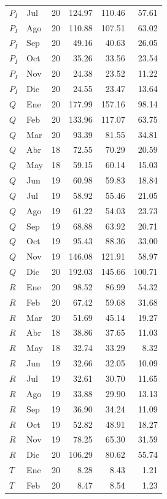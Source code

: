 \documentclass[12pt,letterpaper]{article}
\begin{document}
\begin{longtable}{llrrrr}
$P_I$ & Jul & 20 & 124.97 & 110.46 & 57.61 \\
$P_I$ & Ago & 20 & 110.88 & 107.51 & 63.02 \\
$P_I$ & Sep & 20 & 49.16 & 40.63 & 26.05 \\
$P_I$ & Oct & 20 & 35.26 & 33.56 & 23.54 \\
$P_I$ & Nov & 20 & 24.38 & 23.52 & 11.22 \\
$P_I$ & Dic & 20 & 24.55 & 23.47 & 13.64 \\
$Q$ & Ene & 20 & 177.99 & 157.16 & 98.14 \\
$Q$ & Feb & 20 & 133.96 & 117.07 & 63.75 \\
$Q$ & Mar & 20 & 93.39 & 81.55 & 34.81 \\
$Q$ & Abr & 18 & 72.55 & 70.29 & 20.59 \\
$Q$ & May & 18 & 59.15 & 60.14 & 15.03 \\
$Q$ & Jun & 19 & 60.98 & 59.83 & 18.84 \\
$Q$ & Jul & 19 & 58.92 & 55.46 & 21.05 \\
$Q$ & Ago & 19 & 61.22 & 54.03 & 23.73 \\
$Q$ & Sep & 19 & 68.88 & 63.92 & 20.71 \\
$Q$ & Oct & 19 & 95.43 & 88.36 & 33.00 \\
$Q$ & Nov & 19 & 146.08 & 121.91 & 58.97 \\
$Q$ & Dic & 20 & 192.03 & 145.66 & 100.71 \\
$R$ & Ene & 20 & 98.52 & 86.99 & 54.32 \\
$R$ & Feb & 20 & 67.42 & 59.68 & 31.68 \\
$R$ & Mar & 20 & 51.69 & 45.14 & 19.27 \\
$R$ & Abr & 18 & 38.86 & 37.65 & 11.03 \\
$R$ & May & 18 & 32.74 & 33.29 & 8.32 \\
$R$ & Jun & 19 & 32.66 & 32.05 & 10.09 \\
$R$ & Jul & 19 & 32.61 & 30.70 & 11.65 \\
$R$ & Ago & 19 & 33.88 & 29.90 & 13.13 \\
$R$ & Sep & 19 & 36.90 & 34.24 & 11.09 \\
$R$ & Oct & 19 & 52.82 & 48.91 & 18.27 \\
$R$ & Nov & 19 & 78.25 & 65.30 & 31.59 \\
$R$ & Dic & 20 & 106.29 & 80.62 & 55.74 \\
$T$ & Ene & 20 & 8.28 & 8.43 & 1.21 \\
$T$ & Feb & 20 & 8.47 & 8.54 & 1.23 \\

\end{longtable}
\end{document}
